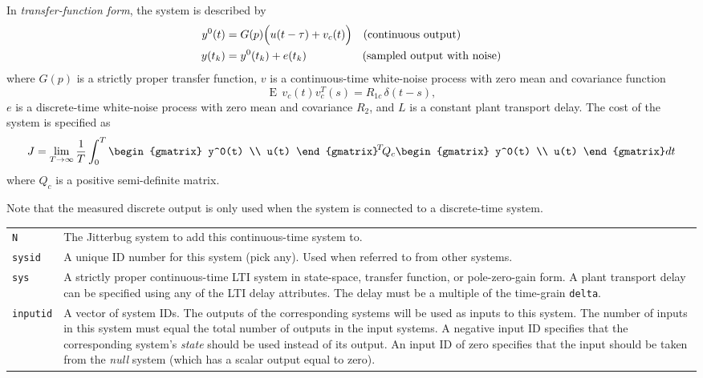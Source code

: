 \documentclass[final,twoside]{rapport}  %
\DeclareMathOperator{\E}{E}
\begin{document}
In {\em transfer-function form}, the system is described by
\[
\begin{aligned}
y^0(t) &= G(p) \Bigl( u(t-\tau) + v_c(t) \Bigr) \quad  \text{(continuous output)} \\
y(t_k) &= y^0(t_k) + e(t_k) \qquad\qquad\quad \text{(sampled output with noise)}
\end{aligned}
\]
where $G(p)$ is a strictly proper transfer function, $v$ is a
continuous-time white-noise process with zero mean and
covariance function
\[
\E \, v_c(t)v_c^T\!(s) = R_{1c} \, \delta(t-s),
\]
$e$ is a discrete-time white-noise process with
zero mean and covariance $R_2$, and $L$ is a constant plant transport
delay. The cost of the system is specified as
\[
J = \lim_{T \rightarrow \infty} \frac{1}{T} \int_0^T
  \begin{gmatrix} y^0(t) \\ u(t) \end{gmatrix}^{\!T} \!Q_c \begin{gmatrix} y^0(t)
    \\ u(t) \end{gmatrix} dt
\]
where $Q_c$ is a positive semi-definite matrix.

Note that the measured discrete output is only used when the system is
connected to a discrete-time system.

\args
\begin{tabularx}{\hsize}{l>{\raggedright\arraybackslash}X}
{\tt N} & The {\sc Jitterbug} system to add this continuous-time system to.
\\
{\tt sysid} &  A unique ID number for this system (pick any). Used when
referred to from other systems.\\
{\tt sys} & A strictly proper continuous-time LTI system in
state-space, transfer function, or pole-zero-gain form. A plant
transport delay can be specified using any of the LTI delay
attributes. The delay must be a multiple of the time-grain {\tt delta}.
\\
{\tt inputid} & A vector of system IDs. The outputs of the corresponding
systems will be used as inputs to this system. The number of inputs in
this system must equal the total number of outputs in the input
systems.  A negative input ID
          specifies that the corresponding system's {\em state} should
          be used instead of its output. An input ID of zero
          specifies that the input should be taken from the {\em null}
          system (which has a scalar output equal to zero).
\end{tabularx}
\end{document}
